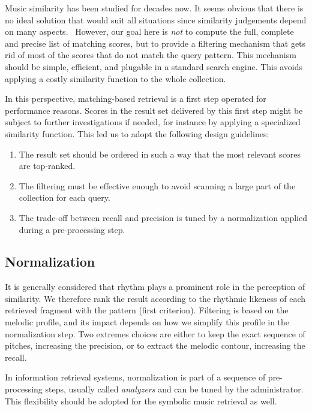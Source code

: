\documentclass[letterpaper, 11pt]{article}
\begin{document}
Music similarity has been studied for decades now. It seems obvious that
there is no ideal solution that would suit all situations since similarity 
judgements depend on many aspects.~\cite{JDE07,ERP17} However, our goal here
is \emph{not} to compute  the full, complete and precise list of matching scores, 
but to provide a filtering mechanism that gets rid of most of the scores that 
do not match the query pattern. This mechanism should be simple, efficient,
and plugable in a standard search engine. This  avoids applying  a costly similarity function to
the whole collection.

In this perspective, matching-based retrieval is a first step operated
for performance reasons. Scores in the result set delivered by this first step might be subject 
to further investigations if needed, for instance by applying a specialized 
similarity function. This led us to adopt the following design guidelines:

\begin{enumerate}
  \item The result set should be ordered in such a way that the most relevant scores are top-ranked.
  \item The filtering must be  effective enough to avoid scanning a large part of the collection 
        for each query.
  \item The trade-off between  recall and precision is tuned by a normalization applied 
  during a pre-processing step. 
\end{enumerate}

\subsection{Normalization}

It is generally considered that rhythm plays a prominent role in the perception of similarity. We therefore
rank the result according to the rhythmic likeness of each retrieved fragment with the pattern (first criterion). 
Filtering is based on the melodic profile, and its impact depends on how we simplify this profile
in the normalization step. Two extremes choices are either to keep the exact sequence of pitches, 
increasing the precision,  or to extract the melodic contour,  increasing the recall.

In information retrieval systems, normalization is part of a sequence of pre-processing steps,
usually called \emph{analyzers} and can be tuned by the administrator. This flexibility should be adopted 
for the symbolic music retrieval as well. 
\end{document}
